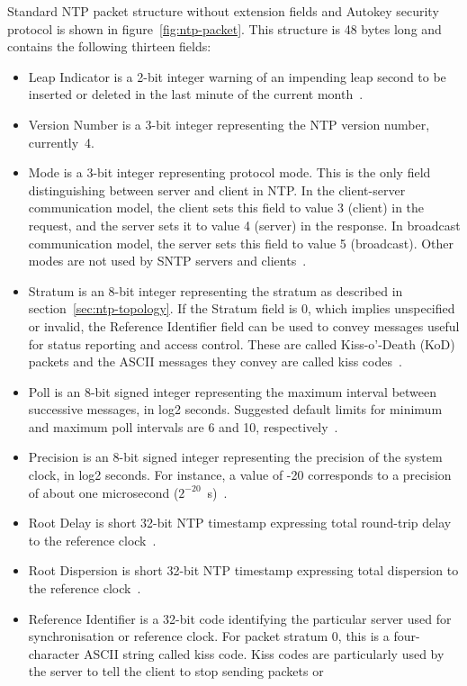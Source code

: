 Standard NTP packet structure without extension fields and
Autokey security protocol is shown in figure~\ref{fig:ntp-packet}.
This structure is 48 bytes long and contains the following thirteen fields:
\begin{itemize}
\item
Leap Indicator is a 2-bit integer warning of an impending leap
second to be inserted or deleted in the last minute of the current month~\cite{rfc5905}.
\item
Version Number is a 3-bit integer representing the NTP
version number, currently~4.
\item
Mode is a 3-bit integer representing protocol mode.
This is the only field distinguishing between server and client in NTP.
In the client-server communication model, the client sets this field to value 3 (client) in the request,
and the server sets it to value 4 (server) in the response.
In broadcast communication model, the server sets this field to value 5 (broadcast).
Other modes are not used by SNTP servers and clients~\cite{rfc4330}.
\item
Stratum is an 8-bit integer representing the stratum as described in section~\ref{sec:ntp-topology}.
If the Stratum field is 0, which implies unspecified or invalid, the
Reference Identifier field can be used to convey messages useful for
status reporting and access control.
These are called Kiss-o'-Death (KoD)
packets and the ASCII messages they convey are called kiss codes~\cite{rfc5905}.
\item
Poll is an 8-bit signed integer representing the maximum interval between
successive messages, in log2 seconds.
Suggested default limits for minimum and maximum poll intervals are 6 and 10, respectively~\cite{rfc5905}.
\item
Precision is an 8-bit signed integer representing the precision of the
system clock, in log2 seconds.
For instance, a value of -20
corresponds to a precision of about one microsecond ($2^{-20}$~s)~\cite{rfc5905}.
\item
Root Delay is short 32-bit NTP timestamp expressing
total round-trip delay to the reference clock~\cite{rfc5905}.
\item
Root Dispersion is short 32-bit NTP timestamp expressing
total dispersion to the reference clock~\cite{rfc5905}.
\item
Reference Identifier is a 32-bit code identifying the particular server used for synchronisation
or reference clock.
For packet stratum 0, this is a four-character ASCII string called kiss code.
Kiss codes are particularly used by the server to tell the client to stop sending packets or

\end{itemize}
